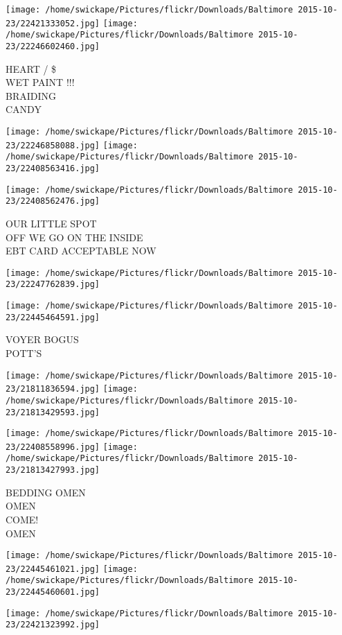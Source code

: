 \documentclass[10pt,letterpaper]{article}
\begin{document}
\texttt{[image: /home/swickape/Pictures/flickr/Downloads/Baltimore 2015-10-23/22421333052.jpg]}
\texttt{[image: /home/swickape/Pictures/flickr/Downloads/Baltimore 2015-10-23/22246602460.jpg]}

HEART / \$\\
WET PAINT !!!\\
BRAIDING\\
CANDY
\pagebreak

\texttt{[image: /home/swickape/Pictures/flickr/Downloads/Baltimore 2015-10-23/22246858088.jpg]}
\texttt{[image: /home/swickape/Pictures/flickr/Downloads/Baltimore 2015-10-23/22408563416.jpg]}

\texttt{[image: /home/swickape/Pictures/flickr/Downloads/Baltimore 2015-10-23/22408562476.jpg]}

OUR LITTLE SPOT\\
OFF WE GO ON THE INSIDE\\
EBT CARD ACCEPTABLE NOW
\pagebreak

\texttt{[image: /home/swickape/Pictures/flickr/Downloads/Baltimore 2015-10-23/22247762839.jpg]}

\vspace{0.25in}
\texttt{[image: /home/swickape/Pictures/flickr/Downloads/Baltimore 2015-10-23/22445464591.jpg]}

VOYER BOGUS\\
POTT'S
\pagebreak

\texttt{[image: /home/swickape/Pictures/flickr/Downloads/Baltimore 2015-10-23/21811836594.jpg]}
\texttt{[image: /home/swickape/Pictures/flickr/Downloads/Baltimore 2015-10-23/21813429593.jpg]}

\texttt{[image: /home/swickape/Pictures/flickr/Downloads/Baltimore 2015-10-23/22408558996.jpg]}
\texttt{[image: /home/swickape/Pictures/flickr/Downloads/Baltimore 2015-10-23/21813427993.jpg]}

BEDDING OMEN\\
OMEN\\
COME!\\
OMEN
\pagebreak

\texttt{[image: /home/swickape/Pictures/flickr/Downloads/Baltimore 2015-10-23/22445461021.jpg]}
\texttt{[image: /home/swickape/Pictures/flickr/Downloads/Baltimore 2015-10-23/22445460601.jpg]}

\vspace{0.25in}
\texttt{[image: /home/swickape/Pictures/flickr/Downloads/Baltimore 2015-10-23/22421323992.jpg]}
\end{document}
